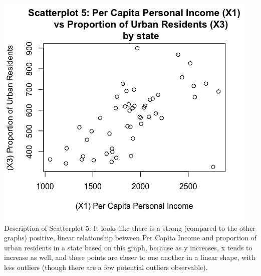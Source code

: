 \documentclass[12pt,letterpaper]{article}
\begin{document}
\begin{itemize}
		\newpage	
		 
		
		\begin{center}
		\includegraphics[scale=.80]{Scatterplot5.png}
		Description of Scatterplot 5: It looks like there is a strong (compared to the other graphs) positive, linear relationship between Per Capita Income and proportion of urban residents in a state based on this graph, because as y increases, x tends to increase as well, and these points are closer to one another in a linear shape, with less outliers (though there are a few potential outliers observable).
		\end{center}
	
		\newpage	
		 
		

\end{itemize}
\end{document}
